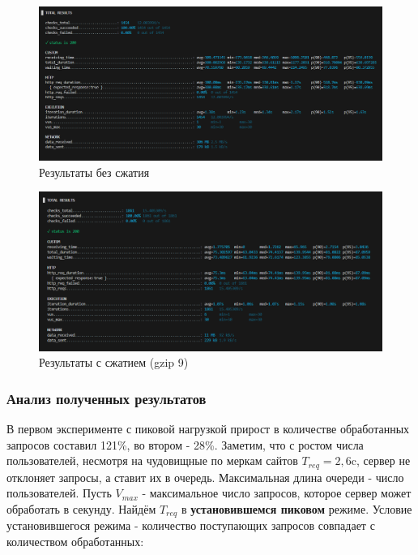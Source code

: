 \documentclass[12pt]{article}
\begin{document}
\begin{figure}[H]
    \centering
    \includegraphics[width=1\textwidth]{../images/no-compress_exp2_k6screen.png}
    \caption{Результаты без сжатия}
\end{figure}

\begin{figure}[H]
    \centering
    \includegraphics[width=1\textwidth]{../images/gzip9_exp2_k6screen.png}
    \caption{Результаты с сжатием (gzip 9)}
\end{figure}

\subsubsection{Анализ полученных результатов }

В первом эксперименте с пиковой нагрузкой прирост в количестве обработанных запросов составил 121\%, во втором - 28\%.
Заметим, что с ростом числа пользователей, несмотря на чудовищные по меркам сайтов $T_{req}=2,6$c,
сервер не отклоняет запросы, а ставит их в очередь. Максимальная длина очереди - число пользователей.
Пусть $V_{max}$ - максимальное число запросов, которое сервер может обработать в секунду.
Найдём $T_{req}$ в \textbf{установившемся пиковом} режиме.
Условие установившегося режима - количество поступающих запросов совпадает с количеством обработанных:
\end{document}
